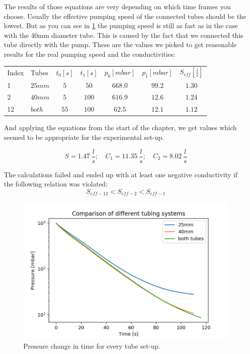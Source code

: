 \documentclass[]{article}
\begin{document}
The results of those equations are very depending on which time frames you choose. Usually the effective pumping speed of the connected tubes should be the lowest. But as you can see in \ref{fig::comparison} the pumping speed is still as fast as in the case with the 40mm diameter tube. This is caused by the fact that we connected this tube directly with the pump. These are the values we picked to get reasonable results for the real pumping speed and the conductivities:

\begin{table}[h]
\centering
\begin{tabular}{llccccc}
Index & Tubes & $t_0 [s]$ & $t_1 [s]$ & $p_0 [mbar]$ & $p_1 [mbar]$ & $S_{eff} [ \frac{l}{s}]$ \\
1 & $25 mm$ & $5$ & $50$ & $668.0$ & $99.2$ & $1.30$  \\
2 & $40 mm$ & $5$ & $100$ & $616.9$ & $12.6$ & $1.24$  \\
12 & $both$ & $55$ & $100$ & $62.5$ & $12.1$ & $1.12$ 
\end{tabular} 
\end{table}

And applying the equations from the start of the chapter, we get values which seemed to be appropriate for the experimental set-up.

\[ S = 1.47 \:\frac{l}{s} ;\quad C_1 = 11.35 \:\frac{l}{s} ;\quad C_2 = 8.02 \:\frac{l}{s} \]

The calculations failed and ended up with at least one negative conductivity if the following relation was violated:
\[ S_{eff-12} < S_{eff-2} < S_{eff-1} \]

\begin{figure}[!h]
\centering\includegraphics[width=.75\textwidth]{Plots/Comparison.png}
\caption{Pressure change in time for every tube set-up.}
\label{fig::comparison}
\end{figure}
\end{document}

